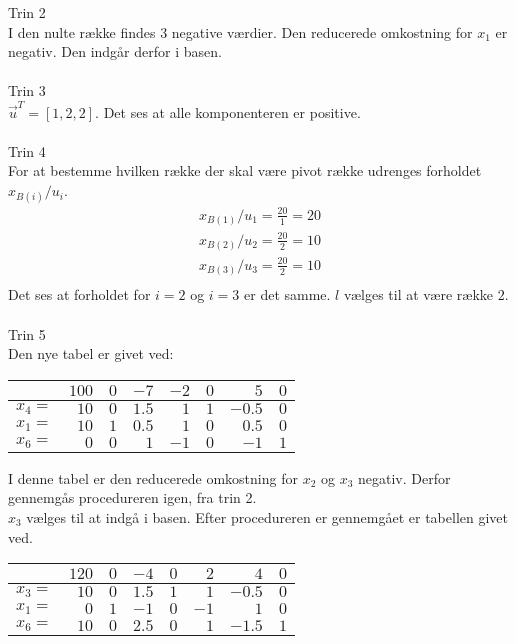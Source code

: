 \begin{eks}
Trin 2\\
I den nulte række findes 3 negative værdier. Den reducerede omkostning for $x_1$ er negativ. Den indgår derfor i basen. \\
\\
Trin 3\\
$\vec{u}^T=[1,2,2]$. Det ses at alle komponenteren er positive. \\
\\
Trin 4\\
For at bestemme hvilken række der skal være pivot række udrenges forholdet $x_{B(i)}/u_i$. 
\begin{align*}
x_{B(1)}/u_1=\frac{20}{1}=20\\
x_{B(2)}/u_2=\frac{20}{2}=10\\
x_{B(3)}/u_3=\frac{20}{2}=10\\
\end{align*}
Det ses at forholdet for $i=2$ og $i=3$ er det samme. $l$ vælges til at være række $2$. \\
\\
Trin 5\\
Den nye tabel er givet ved:
\begin{center}
\begin{tabular}{r| r|r r r r r r|}
  \hline	
  &$100$&$0$ &$-7$&$-2$&$0$&$5$&$0$\\ \hline	
  $x_4=$&$10$&$0$&$1.5$&$1$&$1$&$-0.5$&$0$\\	
  $x_1=$&$10$&$1$&$0.5$&$1$&$0$&$0.5$&$0$\\
  $x_6=$&$0$&$0$&$1$&$-1$&$0$&$-1$&$1$\\
   \hline
\end{tabular}
\end{center}
I denne tabel er den reducerede omkostning for $x_2$ og $x_3$ negativ. Derfor gennemgås procedureren igen, fra trin 2.\\
$x_3$ vælges til at indgå i basen. Efter procedureren er gennemgået er tabellen givet ved. 
\begin{center}
\begin{tabular}{r| r|r r r r r r|}
  \hline	
  &$120$&$0$ &$-4$&$0$&$2$&$4$&$0$\\ \hline	
  $x_3=$&$10$&$0$&$1.5$&$1$&$1$&$-0.5$&$0$\\	
  $x_1=$&$0$&$1$&$-1$&$0$&$-1$&$1$&$0$\\
  $x_6=$&$10$&$0$&$2.5$&$0$&$1$&$-1.5$&$1$\\
   \hline
\end{tabular}
\end{center}

\end{eks}
